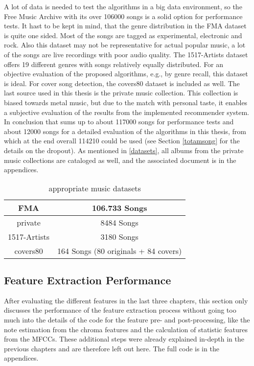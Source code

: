 A lot of data is needed to test the algorithms in a big data environment, so the Free Music Archive with its over 106000 songs is a solid option for performance tests. It hast to be kept in mind, that the genre distribution in the FMA dataset is quite one sided. Most of the songs are tagged as experimental, electronic and rock. Also this dataset may not be representative for actual popular music, a lot of the songs are live recordings with poor audio quality. %
The 1517-Artists dataset offers 19 different genres with songs relatively equally distributed. For an objective evaluation of the proposed algorithms, e.g., by genre recall, this dataset is ideal. For cover song detection, the covers80 dataset is included as well.
The last source used in this thesis is the private music collection. This collection is biased towards metal music, but due to the match with personal taste, it enables a subjective evaluation of the results from the implemented recommender system.\\ 
In conclusion that sums up to about 117000 songs for performance tests and about 12000 songs for a detailed evaluation of the algorithms in this thesis, from which at the end overall 114210 could be used (see Section \ref{totamsong} for the details on the dropout). As mentioned in \ref{datasets}, all albums from the private music collections are cataloged as well, and the associated document is in the appendices. 

\begin{table}[h]
	\label{used_dsets}
	\begin{center}
		\begin{tabular}{|c||c|}
			\hline
			FMA & 106.733 Songs\\
			\hline
			private & 8484 Songs\\
			\hline
			1517-Artists & 3180 Songs\\
			\hline
			covers80 & 164 Songs (80 originals + 84 covers)\\
			\hline
		\end{tabular}
	\end{center}
	\caption{appropriate music datasets}
\end{table}
\FloatBarrier

\subsection{Feature Extraction Performance}

After evaluating the different features in the last three chapters, this section only discusses the performance of the feature extraction process without going too much into the details of the code for the feature pre- and post-processing, like the note estimation from the chroma features and the calculation of statistic features from the MFCCs. These additional steps were already explained in-depth in the previous chapters and are therefore left out here. The full code is in the appendices. 

